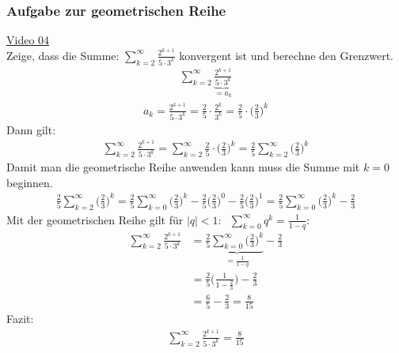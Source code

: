 \subsubsection{Aufgabe zur geometrischen Reihe}
\href{https://youtu.be/FlwGJnrlD4c}{Video 04}\\
Zeige, dass die Summe: $ \sum\limits_{k=2}^{\infty}\frac{2^{k+1}}{5\cdot 3^k} $  konvergent ist und berechne den Grenzwert.\\
\begin{align*}
\sum\limits_{k=2}^{\infty}\underbrace {\frac{2^{k+1}}{5\cdot 3^k}}_{=a_k}
\end{align*}
\begin{align*}
a_k=\frac{2^{k+1}}{5\cdot 3^k}=\frac{2}{5}\cdot \frac{2^k}{3^k}=\frac{2}{5}\cdot \bigg(\frac{2}{3}\bigg)^k
\end{align*}
Dann gilt:\\
\begin{align*}
\sum\limits_{k=2}^{\infty}\frac{2^{k+1}}{5\cdot 3^k}=\sum\limits_{k=2}^{\infty}\frac{2}{5}\cdot \bigg(\frac{2}{3}\bigg)^k=\frac{2}{5}\sum\limits_{k=2}^{\infty}\bigg(\frac{2}{3}\bigg)^k
\end{align*}
Damit man die geometrische Reihe anwenden kann muss die Summe mit $ k=0 $ beginnen.\\
\begin{align*}
\frac{2}{5}\sum\limits_{k=2}^{\infty}\bigg(\frac{2}{3}\bigg)^k=\frac{2}{5}\sum\limits_{k=0}^{\infty}\bigg(\frac{2}{3}\bigg)^k-\frac{2}{5}\bigg(\frac{2}{3}\bigg)^0-\frac{2}{5}\bigg(\frac{2}{3}\bigg)^1=\frac{2}{5}\sum\limits_{k=0}^{\infty}\bigg(\frac{2}{3}\bigg)^k-\frac{2}{3}
\end{align*}
Mit der geometrischen Reihe gilt für $ |q|<1:\;\;\sum\limits_{k=0}^{\infty}q^k=\frac{1}{1-q} $:\\
\begin{align*}
\sum\limits_{k=2}^{\infty}\frac{2^{k+1}}{5\cdot 3^k}&=\frac{2}{5}\underbrace {\sum\limits_{k=0}^{\infty}\bigg(\frac{2}{3}\bigg)^k}_{=\frac{1}{1-q}}-\frac{2}{3}\\
&=\frac{2}{5}\bigg(\frac{1}{1-\frac{2}{3}}\bigg)-\frac{2}{3}\\
&=\frac{6}{5}-\frac{2}{3}=\frac{8}{15}
\end{align*}
Fazit:
\begin{align*}
\sum\limits_{k=2}^{\infty}\frac{2^{k+1}}{5\cdot 3^k}=\frac{8}{15} 
\end{align*}
